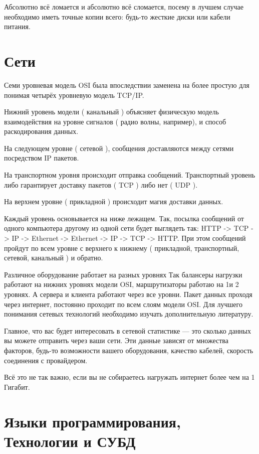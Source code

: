 Абсолютно всё ломается и абсолютно всё сломается, посему в лучшем случае необходимо иметь точные копии всего: будь-то жесткие диски или кабели питания.


\section{ Сети } \label{sect1_19}

Семи уровневая модель OSI была впоследствии заменена на более простую для понимая четырёх уровневую модель  TCP/IP.

Нижний уровень модели ( канальный ) объясняет физическую модель взаимодействия на уровне сигналов ( радио волны, например), и способ раскодирования данных.

На следующем уровне ( сетевой ), сообщения доставляются между сетями посредством IP пакетов.

На транспортном уровня происходит отправка сообщений. Транспортный уровень либо гарантирует доставку пакетов ( TCP ) либо нет ( UDP ).

На верхнем уровне ( прикладной ) происходит магия доставки данных. 

Каждый уровень основывается на ниже лежащем. Так, посылка сообщений от одного компьютера другому из одной сети будет выглядеть так: HTTP -> TCP -> IP -> Ethernet -> Ethernet -> IP -> TCP -> HTTP. При этом сообщений пройдут по всем уровне с верхнего к нижнему ( прикладной, транспортный, сетевой, канальный ) и обратно.


Различное оборудование работает на разных уровнях Так балансеры нагрузки работают на нижних уровнях модели OSI, маршрутизаторы работаю на 1и 2 уровнях. А сервера и клиента работают через все уровни. Пакет данных проходя через интернет, постоянно проходит по всем слоям модели OSI. Для лучшего понимания сетевых технологий необходимо изучать дополнительную литературу.


Главное, что вас будет интересовать в сетевой статистике --- это сколько данных вы можете отправить через ваши сети. Эти данные зависят от множества факторов, будь-то возможности вашего оборудования, качество кабелей, скорость соединения с провайдером. 

Всё это не так важно, если вы не собираетесь нагружать интернет более чем на 1 Гигабит.

\section{ Языки программирования, Технологии и СУБД } \label{sect1_20}

